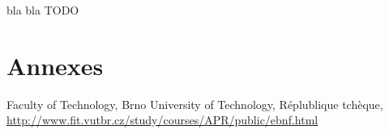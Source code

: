 \documentclass[french]{article}
\begin{document}
	bla bla TODO
	
	\section{Annexes}
	
	\begin{thebibliography}{9}
		Faculty of Technology, Brno University of Technology, Réplublique tchèque,\\ \url{http://www.fit.vutbr.cz/study/courses/APR/public/ebnf.html}
	\end{thebibliography}			
\end{document}
